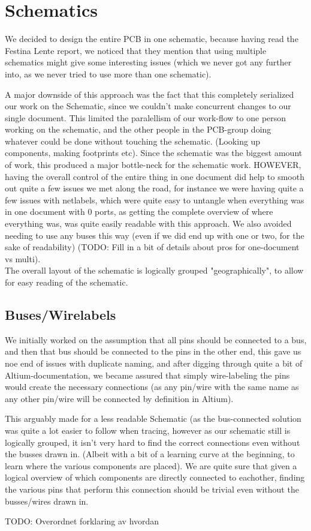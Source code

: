 \section {Schematics}

We decided to design the entire PCB in one schematic, because having read
the Festina Lente report, we noticed that they mention that using multiple schematics
might give some interesting issues (which we never got any further into,
as we never tried to use more than one schematic).

A major downside of this approach was the fact that this completely serialized our
work on the Schematic, since we couldn't make concurrent changes to our single document.
This limited the paralellism of our work-flow to one person working on the schematic,
and the other people in the PCB-group doing whatever could be done without touching the schematic.
(Looking up components, making footprints etc). Since the schematic was the biggest amount
of work, this produced a major bottle-neck for the schematic work. HOWEVER, having the overall
control of the entire thing in one document did help to smooth out quite a few issues we met
along the road, for instance we were having quite a few issues with netlabels, which were quite
easy to untangle when everything was in one document with 0 ports, as getting the complete overview
of where everything was, was quite easily readable with this approach. We also avoided needing
to use any buses this way (even if we did end up with one or two, for the sake of readability)
(TODO: Fill in a bit of details about pros for one-document vs multi). \\

The overall layout of the schematic is logically grouped "geographically", to
allow for easy reading of the schematic.

\subsection {Buses/Wirelabels}
We initially worked on the assumption that all pins should be connected to a bus, and then
that bus should be connected to the pins in the other end, this gave us noe end of issues with
duplicate naming, and after digging through quite a bit of Altium-documentation, we became
assured that simply wire-labeling the pins would create the necessary connections (as any
pin/wire with the same name as any other pin/wire will be connected by definition in Altium).

This arguably made for a less readable Schematic (as the bus-connected solution was quite a lot
easier to follow when tracing, however as our schematic still is logically grouped, it isn't very hard
to find the correct connections even without the busses drawn in. (Albeit with a bit of a learning curve
at the beginning, to learn where the various components are placed). We are quite sure that given
a logical overview of which components are directly connected to eachother, finding the various pins
that perform this connection should be trivial even without the busses/wires drawn in.

TODO: Overordnet forklaring av hvordan
